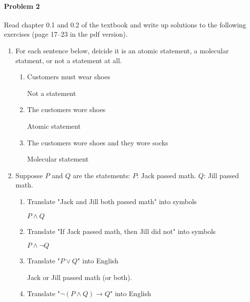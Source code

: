 \documentclass[11pt, a4paper]{article}
\newcommand\setItemNumber[1]{\setcounter{enumi}{\numexpr#1-1\relax}}
\begin{document}
\paragraph{Problem 2} Read chapter 0.1 and 0.2 of the textbook and write up solutions to the following exercises (page 17--23 in the pdf version).


\begin{enumerate}
    \item For each sentence below, deicide it is an atomic statement, a molecular statment, or not a statement at all.
        \begin{enumerate}
            \item Customers must wear shoes

                Not a statement 

            \item The customers wore shoes 

                Atomic statement

            \item The customers wore shoes and they wore socks 

                Molecular statement

        \end{enumerate}
    
    \setItemNumber{3}
    \item Supposse $P$ and $Q$ are the statements: $P$: Jack passed math. $Q$: Jill passed math.
        \begin{enumerate}
            \item Translate "Jack and Jill both passed math" into symbols

                $P \land Q$

            \item Translate "If Jack passed math, then Jill did not" into symbols

                $P \land \neg Q$

            \item Translate "$P \lor Q$" into English

                Jack or Jill passed math (or both).

            \item Translate "$ \neg(P \land Q) \rightarrow Q$" into English


\end{enumerate}
\end{enumerate}
\end{document}
